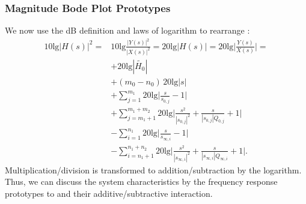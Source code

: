 \subsubsection{Magnitude Bode Plot Prototypes}
We now use the dB definition and laws of logarithm to rearrange :
\begin{align}
10 \text{lg} |H(s)|^2 =
& 10 \text{lg} \frac{|Y(s)|^2}{|X(s)|^2} =
20 \text{lg} |H(s)| = 20 \text{lg} \bigg|\frac{Y(s)}{X(s)}\bigg| =\nonumber\\
\label{eq:Hs_sorted_for_Bode_dB_gain}
& +20 \text{lg} |\tilde{H_0}|\\
\label{eq:Hs_sorted_for_Bode_dB_origin}
& +(m_0-n_0) \, 20 \text{lg} |s|\\
\label{eq:Hs_sorted_for_Bode_dB_zero}
& +\sum\limits_{j=1}^{m_1} 20 \text{lg}  \bigg|\frac{s}{s_{0,j}}-1\bigg|\\
\label{eq:Hs_sorted_for_Bode_dB_cczero}
& +\sum\limits_{j=m_1+1}^{m_1+m_2} 20 \text{lg} \bigg|\frac{s^2}{|s_{0,j}|^2} + \frac{s}{|s_{0,j}| Q_{0,j}} + 1\bigg|\\
\label{eq:Hs_sorted_for_Bode_dB_pole}
&-\sum\limits_{i=1}^{n_1} 20 \text{lg} \bigg|\frac{s}{s_{\infty,i}}-1\bigg|\\
\label{eq:Hs_sorted_for_Bode_dB_ccpole}
&-\sum\limits_{i=n_1+1}^{n_1+n_2} 20 \text{lg} \bigg|\frac{s^2}{|s_{\infty,i}|^2} + \frac{s}{|s_{\infty,i}| Q_{\infty,i}} + 1\bigg|.
\end{align}
%
Multiplication/division is transformed to addition/subtraction by the logarithm.
Thus, we can discuss the system characteristics by the frequency response prototypes
 to  and
their additive/subtractive interaction.

